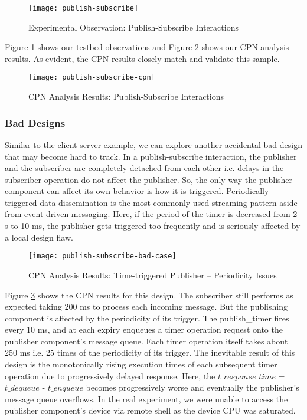 \begin{figure}[h]
	\centering
	\texttt{[image: publish-subscribe]}
	\caption{Experimental Observation: Publish-Subscribe Interactions}
	\label{fig:publish-subscribe}
\end{figure}
\FloatBarrier

Figure \ref{fig:publish-subscribe} shows our testbed observations and Figure \ref{fig:publish-subscribe-cpn} shows our CPN analysis results. As evident, the CPN results closely match and validate this sample. 

\begin{figure}[h]
	\centering
	\texttt{[image: publish-subscribe-cpn]}
	\caption{CPN Analysis Results: Publish-Subscribe Interactions}
	\label{fig:publish-subscribe-cpn}
\end{figure}
\FloatBarrier

\subsubsection{Bad Designs}

Similar to the client-server example, we can explore another accidental bad design that may become hard to track. In a publish-subscribe interaction, the publisher and the subscriber are completely detached from each other i.e. delays in the subscriber operation do not affect the publisher. So, the only way the publisher component can affect its own behavior is how it is triggered. Periodically triggered data dissemination is the most commonly used streaming pattern aside from event-driven messaging. Here, if the period of the timer is decreased from 2 s to 10 ms, the publisher gets triggered too frequently and is seriously affected by a local design flaw.  

\begin{figure}[h]
	\centering
	\texttt{[image: publish-subscribe-bad-case]}
	\caption{CPN Analysis Results: Time-triggered Publisher -- Periodicity Issues}
	\label{fig:publish-subscribe-bad-case}
\end{figure}
\FloatBarrier

Figure \ref{fig:publish-subscribe-bad-case} shows the CPN results for this design. The subscriber still performs as expected taking 200 ms to process each incoming message. But the publishing component is affected by the periodicity of its trigger. The publish\_timer fires every 10 ms, and at each expiry enqueues a timer operation request onto the publisher component's message queue. Each timer operation itself takes about 250 ms i.e. 25 times of the periodicity of its trigger. The inevitable result of this design is the monotonically rising execution times of each subsequent timer operation due to progressively delayed response. Here, the $t\_response\_time$ = $t\_dequeue$ - $t\_enqueue$ becomes progressively worse and eventually the publisher's message queue overflows. In the real experiment, we were unable to access the publisher component's device via remote shell as the device CPU was saturated. 

